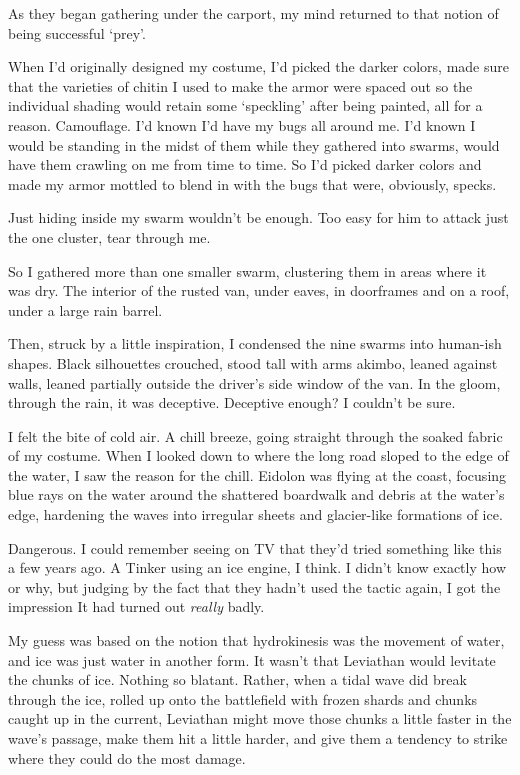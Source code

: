 As they began gathering under the carport, my mind returned to that notion of being successful `prey'.



When I'd originally designed my costume, I'd picked the darker colors, made sure that the varieties of chitin I used to make the armor were spaced out so the individual shading would retain some `speckling' after being painted, all for a reason.  Camouflage.  I'd known I'd have my bugs all around me.  I'd known I would be standing in the midst of them while they gathered into swarms, would have them crawling on me from time to time.  So I'd picked darker colors and made my armor mottled to blend in with the bugs that were, obviously, specks.



Just hiding inside my swarm wouldn't be enough.  Too easy for him to attack just the one cluster, tear through me.



So I gathered more than one smaller swarm, clustering them in areas where it was dry.  The interior of the rusted van, under eaves, in doorframes and on a roof, under a large rain barrel.



Then, struck by a little inspiration, I condensed the nine swarms into human-ish shapes.  Black silhouettes crouched, stood tall with arms akimbo, leaned against walls, leaned partially outside the driver's side window of the van.  In the gloom, through the rain, it was deceptive.  Deceptive enough?  I couldn't be sure.



I felt the bite of cold air.  A chill breeze, going straight through the soaked fabric of my costume.  When I looked down to where the long road sloped to the edge of the water, I saw the reason for the chill.  Eidolon was flying at the coast, focusing blue rays on the water around the shattered boardwalk and debris at the water's edge, hardening the waves into irregular sheets and glacier-like formations of ice.



Dangerous.  I could remember seeing on TV that they'd tried something like this a few years ago.  A Tinker using an ice engine, I think.  I didn't know exactly how or why, but judging by the fact that they hadn't used the tactic again, I got the impression It had turned out \emph{really} badly.



My guess was based on the notion that hydrokinesis was the movement of water, and ice was just water in another form.  It wasn't that Leviathan would levitate the chunks of ice.  Nothing so blatant.  Rather, when a tidal wave did break through the ice, rolled up onto the battlefield with frozen shards and chunks caught up in the current, Leviathan might move those chunks a little faster in the wave's passage, make them hit a little harder, and give them a tendency to strike where they could do the most damage.



